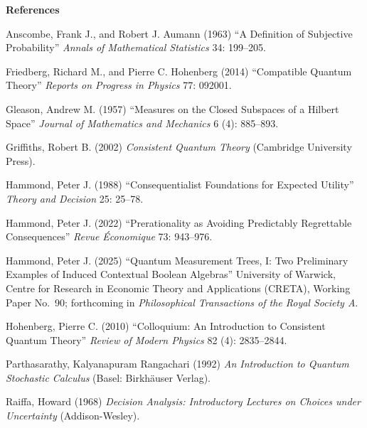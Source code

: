 \documentclass[11pt]{article}
\begin{document}
\newpage
\begin{center} \textbf{References} 
\end{center}

\begin{description}
\small

\item Anscombe, Frank J., and Robert J. Aumann (1963)	
	``A Definition of Subjective Probability''
	\textit{Annals of Mathematical Statistics} 34: 199--205.

\item Friedberg, Richard M., and Pierre C. Hohenberg (2014) ``Compatible Quantum Theory''
	\textit{Reports on Progress in Physics} 77: 092001.

\item Gleason, Andrew M. (1957)
	``Measures on the Closed Subspaces of a Hilbert Space''
	\textit{Journal of Mathematics and Mechanics} 6 (4): 885--893.

\item Griffiths, Robert B. (2002) \textit{Consistent Quantum Theory}
	(Cambridge University Press).
	
\item Hammond, Peter J. (1988) ``Consequentialist Foundations for Expected Utility''
	\textit{Theory and Decision} 25: 25--78.

\item Hammond, Peter J. (2022) 
	``Prerationality as Avoiding Predictably Regrettable Consequences''
	\textit{Revue \'Economique} 73: 943--976.
	
\item Hammond, Peter J. (2025) ``Quantum Measurement Trees, I: 
	Two Preliminary Examples of Induced Contextual Boolean Algebras'' 
	University of Warwick, Centre for Research in Economic Theory and Applications (CRETA),
	Working Paper No.\ 90; 
	forthcoming in \textit{Philosophical Transactions of the Royal Society A}.

\item Hohenberg, Pierre C. (2010) 
	``Colloquium: An Introduction to Consistent Quantum Theory''
	\textit{Review of Modern Physics} 82 (4): 2835--2844.

\item Parthasarathy, Kalyanapuram Rangachari (1992)
	\textit{An Introduction to Quantum Stochastic Calculus} (Basel: Birkh\"auser Verlag).

\item Raiffa, Howard (1968) 
	\textit{Decision Analysis: Introductory Lectures on Choices under Uncertainty}
	(Addison-Wesley).


\end{description}
\end{document}

